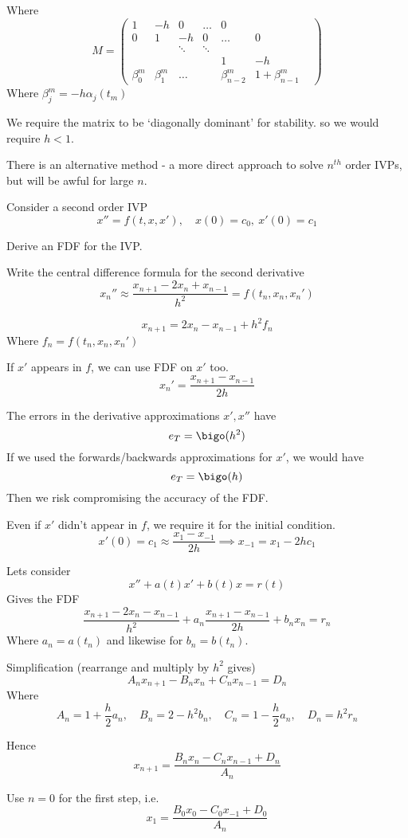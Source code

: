 \documentclass{X:/Documents/Coding/Latex/myassignment}
\begin{document}
Where
\[M = \begin{pmatrix}
    1&-h&0&\ldots&0\\
    0&1&-h&0&\ldots&0\\
    &&\ddots&\ddots&&&\\
    &&&&1&-h\\
    \beta_0^m &\beta_1^m &\ldots&& \beta_{n-2}^m &1+\beta_{n-1}^m
\end{pmatrix}\]
Where $\beta_j^m = -h \alpha_j (t_m)$

We require the matrix to be `diagonally dominant' for stability. so we would require $h < 1$.


There is an alternative method - a more direct approach to solve $n^{th}$ order IVPs, but will be awful for large $n$. 

Consider a second order IVP
\[x'' = f(t,x,x'), \quad x(0) = c_0, \ x'(0) = c_1\]

Derive an FDF for the IVP.

Write the central difference formula for the second derivative
\[x_n '' \approx \frac{x_{n+1} - 2x_n + x_{n-1}}{h^2} = f(t_n,x_n,x_n')\]

\[x_{n+1} = 2x_n - x_{n-1} + h^2 f_n\]
Where $f_n = f(t_n,x_n,x_n')$

If $x'$ appears in $f$, we can use FDF on $x'$ too.
\[x_n' = \frac{x_{n+1} - x_{n-1}}{2h}\]

The errors in the derivative approximations $x', x''$ have 
\[e_T = \bigo(h^2)\]
If we used the forwards/backwards approximations for $x'$, we would have
\[e_T = \bigo(h)\]
Then we risk compromising the accuracy of the FDF.


Even if $x'$ didn't appear in $f$, we require it for the initial condition.
\[x'(0) = c_1 \approx \frac{x_1 - x_{-1}}{2h} \implies x_{-1} = x_1 - 2hc_1\]


Lets consider 
\[x'' + a(t)x' + b(t) x = r(t)\]
Gives the FDF
\[\frac{x_{n+1} - 2x_n - x_{n-1}}{h^2} + a_n \frac{x_{n+1} - x_{n-1}}{2h} + b_nx_n = r_n\]
Where $a_n = a(t_n)$ and likewise for $b_n = b(t_n)$.

Simplification (rearrange and multiply by $h^2$ gives) 
\[A_nx_{n+1} - B_nx_{n} + C_n x_{n-1} = D_n\]
Where
\[A_n = 1 + \frac{h}{2}a_n, \quad B_n =2-h^2b_n  ,\quad C_n = 1 -\frac{h}{2} a_n  ,\quad D_n = h^2 r_n\]

Hence
\[x_{n+1} = \frac{B_nx_{n} - C_nx_{n-1} + D_n}{A_n}\]

Use $n=0$ for the first step, i.e. 
\[x_1 = \frac{B_0x_0 - C_0 x_{-1} +D_0}{A_n}\]
\end{document}
